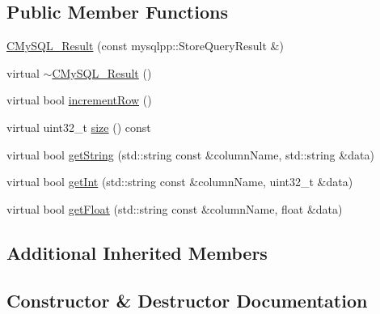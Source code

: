 \subsection*{Public Member Functions}
\begin{DoxyCompactItemize}
\item 
\hyperlink{classCore_1_1CMySQL__Result_a38f36961f586d9c7763300c88aa85a9c}{C\+My\+S\+Q\+L\+\_\+\+Result} (const mysqlpp\+::\+Store\+Query\+Result \&)
\item 
virtual \hyperlink{classCore_1_1CMySQL__Result_a6237ebfb0438d571b713a62606ad0f5c}{$\sim$\+C\+My\+S\+Q\+L\+\_\+\+Result} ()
\item 
virtual bool \hyperlink{classCore_1_1CMySQL__Result_a432de24b42bb64ff4eb082ee6db97d52}{increment\+Row} ()
\item 
virtual uint32\+\_\+t \hyperlink{classCore_1_1CMySQL__Result_af5e5f0783f0ee7e09ae508bb81176bb8}{size} () const 
\item 
virtual bool \hyperlink{classCore_1_1CMySQL__Result_a839fa1572ea7a20041ec8b5181017e80}{get\+String} (std\+::string const \&column\+Name, std\+::string \&data)
\item 
virtual bool \hyperlink{classCore_1_1CMySQL__Result_add098e59d4e53d790a8934acc64543e8}{get\+Int} (std\+::string const \&column\+Name, uint32\+\_\+t \&data)
\item 
virtual bool \hyperlink{classCore_1_1CMySQL__Result_aa3d600b73235197ae49926fdc726e1a2}{get\+Float} (std\+::string const \&column\+Name, float \&data)
\end{DoxyCompactItemize}
\subsection*{Additional Inherited Members}


\subsection{Constructor \& Destructor Documentation}
